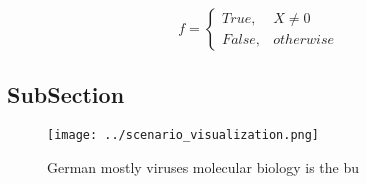 \documentclass[a4paper]{article}
\begin{document}
\begin{equation}   f =
\begin{cases} True, & X \neq 0\\
False, & otherwise
\end{cases}
\end{equation}

\subsection{SubSection}

\begin{figure}
\centering
\texttt{[image: ../scenario\_visualization.png]}
\caption{German mostly viruses molecular biology is the bu
}
\end{figure}
 
\end{document}
